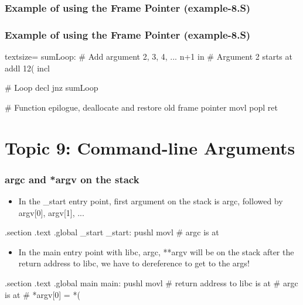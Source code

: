 \documentclass[11pt,xcolor=dvipsnames]{beamer}
\newcommand{\mvs}{\vspace{-0.95em}}
\begin{document}
\begin{frame}[fragile,t]
\frametitle{Example of using the Frame Pointer (example-8.S)}
\mvs
{}
\end{frame}

\begin{frame}[fragile,t]
\frametitle{Example of using the Frame Pointer (example-8.S)}
\mvs
\begin{gascode*}{textsize=}
    sumLoop:
      # Add argument 2, 3, 4, ... n+1 in %
      # Argument 2 starts at %
      addl 12(%
      incl %

      # Loop
      decl %
      jnz sumLoop

    # Function epilogue, deallocate and restore old frame pointer
    movl %
    popl %
    ret
\end{gascode*}
\end{frame}

\section{Topic 9: Command-line Arguments}

\begin{frame}[fragile,t]
\frametitle{{\ttfamily argc} and {\ttfamily **argv} on the stack}
\mvs
\begin{itemize}
  \item In the {\ttfamily \_start} entry point, first argument on the stack is {\ttfamily argc}, followed by {\ttfamily argv[0], argv[1], ...}
\end{itemize}
\begin{gascode}
.section .text
.global _start
_start:
  pushl %
  movl %
  # argc is at %
\end{gascode}
\begin{itemize}
  \item In the {\ttfamily main} entry point with libc, {\ttfamily argc, **argv} will be on the stack after the return address to libc, we have to dereference to get to the args!
\end{itemize}
\begin{gascode}
.section .text
.global main
main:
  pushl %
  movl %
  # return address to libc is at %
  # argc is at %
  # *argv[0] = *(%
\end{gascode}
\end{frame}
\end{document}
